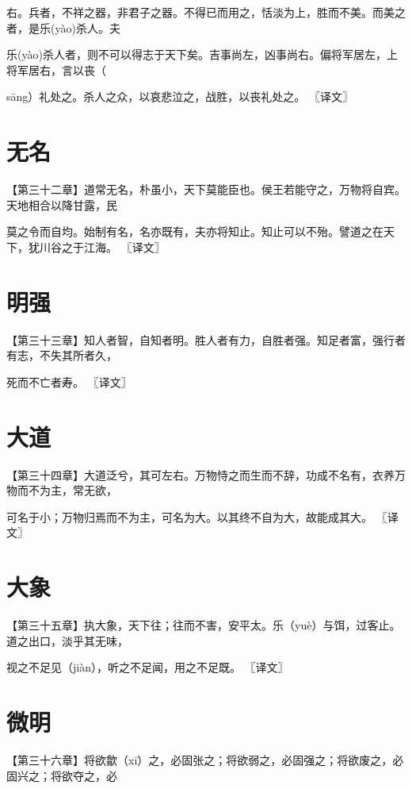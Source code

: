 \documentclass[a4paper,12pt,UTF8,twoside]{ctexbook}
\begin{document}
	右。兵者，不祥之器，非君子之器。不得已而用之，恬淡为上，胜而不美。而美之者，是乐(yào)杀人。夫
	
	乐(yào)杀人者，则不可以得志于天下矣。吉事尚左，凶事尚右。偏将军居左，上将军居右，言以丧（
	
	sāng）礼处之。杀人之众，以哀悲泣之，战胜，以丧礼处之。 〖译文〗
	
	
	
	
	\chapter{无名}
	【第三十二章】道常无名，朴虽小，天下莫能臣也。侯王若能守之，万物将自宾。天地相合以降甘露，民
	
	莫之令而自均。始制有名，名亦既有，夫亦将知止。知止可以不殆。譬道之在天下，犹川谷之于江海。 〖译文〗
	
	
	
	\chapter{明强}
	
	【第三十三章】知人者智，自知者明。胜人者有力，自胜者强。知足者富，强行者有志，不失其所者久，
	
	死而不亡者寿。 〖译文〗
	
	
	
	\chapter{大道}
	
	【第三十四章】大道泛兮，其可左右。万物恃之而生而不辞，功成不名有，衣养万物而不为主，常无欲，
	
	可名于小；万物归焉而不为主，可名为大。以其终不自为大，故能成其大。 〖译文〗
	
	
	
	
	\chapter{大象}
	【第三十五章】执大象，天下往；往而不害，安平太。乐（yuè）与饵，过客止。道之出口，淡乎其无味，
	
	视之不足见（jiàn），听之不足闻，用之不足既。 〖译文〗
	
	
	
	
	\chapter{微明}
	【第三十六章】将欲歙（xī）之，必固张之；将欲弱之，必固强之；将欲废之，必固兴之；将欲夺之，必
	
\end{document}
